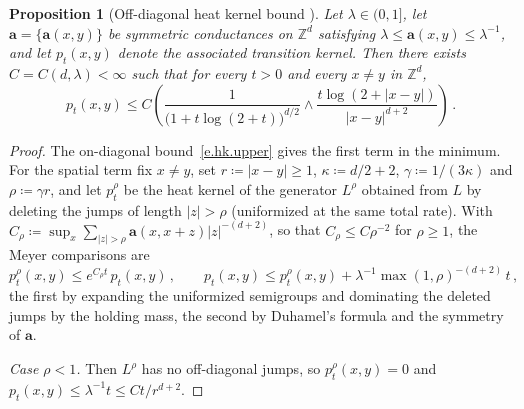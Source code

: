\documentclass[11pt]{amsart}
\theoremstyle{plain}
\newtheorem{proposition}[theorem]{Proposition}
\theoremstyle{definition}
\theoremstyle{remark}
\newcommand{\Zd}{\mathbb{Z}^d}
\renewcommand{\a}{\mathbf{a}}
\begin{document}
	\begin{proposition}[Off-diagonal heat kernel bound {\cite[Theorem~1.12]{ChenKumagaiWang2019}}]
		\label{p.heatkernel.offdiag}
		Let $\lambda \in (0,1]$, let $\a = \{\a(x,y)\}$ be symmetric conductances on $\Zd$ satisfying $\lambda \le \a(x,y) \le \lambda^{-1}$, and let $p_t(x,y)$ denote the associated transition kernel.
		Then there exists $C = C(d,\lambda) < \infty$ such that for every $t > 0$ and every $x \ne y$ in $\Zd$,
		\begin{equation}
			\label{e.hk.offdiag}
			p_t(x,y) \le C\left(\frac{1}{\bigl(1 + t\log(2{+}t)\bigr)^{d/2}} \wedge \frac{t\log(2{+}|x-y|)}{|x-y|^{d+2}}\right)\,.
		\end{equation}
	\end{proposition}
	
	\begin{proof}
		The on-diagonal bound~\eqref{e.hk.upper} gives the first term in the minimum. For the spatial term fix $x \ne y$, set $r \coloneqq |x-y| \ge 1$,
		$\kappa \coloneqq d/2 + 2$, $\gamma \coloneqq 1/(3\kappa)$ and $\rho \coloneqq \gamma r$, and let $p^\rho_t$ be the heat kernel of the generator $L^\rho$
		obtained from $L$ by deleting the jumps of length $|z| > \rho$ (uniformized at the same total rate). With
		$C_\rho \coloneqq \sup_x \sum_{|z|>\rho}\a(x,x{+}z)|z|^{-(d+2)}$, so that $C_\rho \le C\rho^{-2}$ for $\rho \ge 1$, the Meyer comparisons are
		\[
		p^\rho_t(x,y) \le e^{C_\rho t}\,p_t(x,y)\,, \qquad
		p_t(x,y) \le p^\rho_t(x,y) + \lambda^{-1}\max(1,\rho)^{-(d+2)}\,t\,,
		\]
		the first by expanding the uniformized semigroups and dominating the deleted jumps by the holding mass, the second by Duhamel's formula
		and the symmetry of $\a$.

		\emph{Case $\rho < 1$.} Then $L^\rho$ has no off-diagonal jumps, so $p^\rho_t(x,y) = 0$ and $p_t(x,y) \le \lambda^{-1}t \le Ct/r^{d+2}$.


\end{proof}
\end{document}
